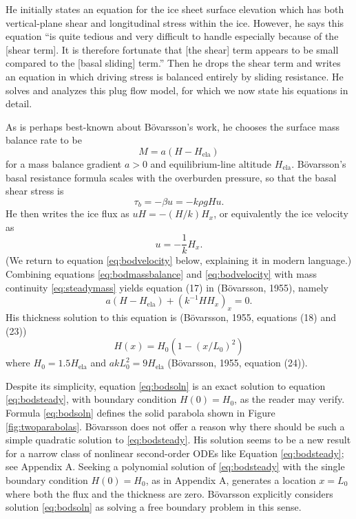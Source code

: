 \documentclass[twocolumn]{igs}
\renewcommand{\dh}{\fontencoding{T1}\selectfont{\symbol{240}}}
\newcommand{\bod}{B\"o\dh varsson\xspace}
\newcommand{\citepbod}{(B\"o\dh varsson, 1955)\nocite{Bodvardsson}\xspace}
\newcommand{\Hela}{H_{\text{ela}}}
\begin{document}
He initially states an equation for the ice sheet surface elevation which has both vertical-plane shear and longitudinal stress within the ice.  However, he says this equation ``is quite tedious and very difficult to handle especially because of the [shear term].  It is therefore fortunate that [the shear] term appears to be small compared to the [basal sliding] term.''  Then he drops the shear term and writes an equation in which driving stress is balanced entirely by sliding resistance.  He solves and analyzes this plug flow model, for which we now state his equations in detail.

As is perhaps best-known about \bod's work, he chooses the surface mass balance rate to be
\begin{equation}
M = a (H - \Hela)  \label{eq:bodmassbalance}
\end{equation}
for a mass balance gradient $a>0$ and equilibrium-line altitude $\Hela$.  \bod's basal resistance formula scales with the overburden pressure, so that the basal shear stress is
\begin{equation}
\tau_b = - \beta u = - k \rho g H u.  \label{eq:bodstresschoice}
\end{equation}
He then writes the ice flux as $uH=-(H/k) H_x$, or equivalently the ice velocity as
\begin{equation}
u = - \frac{1}{k} H_x. \label{eq:bodvelocity}
\end{equation}
(We return to equation \eqref{eq:bodvelocity} below, explaining it in modern language.)  Combining equations \eqref{eq:bodmassbalance} and \eqref{eq:bodvelocity} with mass continuity \eqref{eq:steadymass} yields equation (17) in \citepbod, namely
\begin{equation}
a (H - \Hela) + (k^{-1} H H_x)_x = 0.  \label{eq:bodsteady}
\end{equation}
His thickness solution to this equation is (\bod, 1955, equations (18) and (23))\nocite{Bodvardsson}
\begin{equation}
H(x) = H_0 (1 - (x/L_0)^2)  \label{eq:bodsoln}
\end{equation}
where $H_0 = 1.5 \Hela$ and $a k L_0^2 = 9 \Hela$ (\bod, 1955, equation (24))\nocite{Bodvardsson}.

Despite its simplicity, equation \eqref{eq:bodsoln} is an exact solution to equation \eqref{eq:bodsteady}, with boundary condition $H(0)=H_0$, as the reader may verify.  Formula \eqref{eq:bodsoln} defines the solid parabola shown in Figure \ref{fig:twoparabolas}.  \bod does not offer a reason why there should be such a simple quadratic solution to \eqref{eq:bodsteady}.  His solution seems to be a new result for a narrow class of nonlinear second-order ODEs like Equation \eqref{eq:bodsteady}; see Appendix A.  Seeking a polynomial solution of \eqref{eq:bodsteady} with the single boundary condition $H(0)=H_0$, as in Appendix A, generates a location $x=L_0$ where both the flux and the thickness are zero.  \bod explicitly considers solution \eqref{eq:bodsoln} as solving a free boundary problem in this sense.
\end{document}
